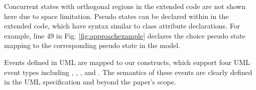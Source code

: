Concurrent states with orthogonal regions in the extended code are not shown here due to space limitation. 
Pseudo states can be declared within  in the extended code, which have syntax similar to class attribute declarations.
For example, line 49 in Fig. \ref{fig:approachexample} declares the  choice pseudo state mapping to the corresponding pseudo state in the  model.   

\noindent
{}
Events defined in UML are mapped to our constructs, which support four UML event types including , , , and .
The semantics of these events are clearly defined in the UML specification and beyond the paper's scope.

